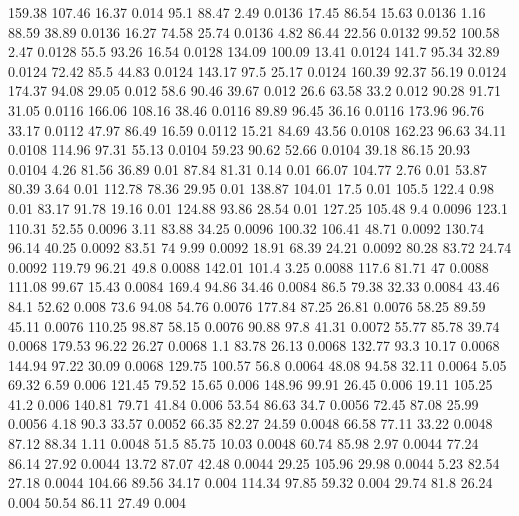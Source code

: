 159.38	107.46	16.37	0.014
95.1	88.47	2.49	0.0136
17.45	86.54	15.63	0.0136
1.16	88.59	38.89	0.0136
16.27	74.58	25.74	0.0136
4.82	86.44	22.56	0.0132
99.52	100.58	2.47	0.0128
55.5	93.26	16.54	0.0128
134.09	100.09	13.41	0.0124
141.7	95.34	32.89	0.0124
72.42	85.5	44.83	0.0124
143.17	97.5	25.17	0.0124
160.39	92.37	56.19	0.0124
174.37	94.08	29.05	0.012
58.6	90.46	39.67	0.012
26.6	63.58	33.2	0.012
90.28	91.71	31.05	0.0116
166.06	108.16	38.46	0.0116
89.89	96.45	36.16	0.0116
173.96	96.76	33.17	0.0112
47.97	86.49	16.59	0.0112
15.21	84.69	43.56	0.0108
162.23	96.63	34.11	0.0108
114.96	97.31	55.13	0.0104
59.23	90.62	52.66	0.0104
39.18	86.15	20.93	0.0104
4.26	81.56	36.89	0.01
87.84	81.31	0.14	0.01
66.07	104.77	2.76	0.01
53.87	80.39	3.64	0.01
112.78	78.36	29.95	0.01
138.87	104.01	17.5	0.01
105.5	122.4	0.98	0.01
83.17	91.78	19.16	0.01
124.88	93.86	28.54	0.01
127.25	105.48	9.4	0.0096
123.1	110.31	52.55	0.0096
3.11	83.88	34.25	0.0096
100.32	106.41	48.71	0.0092
130.74	96.14	40.25	0.0092
83.51	74	9.99	0.0092
18.91	68.39	24.21	0.0092
80.28	83.72	24.74	0.0092
119.79	96.21	49.8	0.0088
142.01	101.4	3.25	0.0088
117.6	81.71	47	0.0088
111.08	99.67	15.43	0.0084
169.4	94.86	34.46	0.0084
86.5	79.38	32.33	0.0084
43.46	84.1	52.62	0.008
73.6	94.08	54.76	0.0076
177.84	87.25	26.81	0.0076
58.25	89.59	45.11	0.0076
110.25	98.87	58.15	0.0076
90.88	97.8	41.31	0.0072
55.77	85.78	39.74	0.0068
179.53	96.22	26.27	0.0068
1.1	83.78	26.13	0.0068
132.77	93.3	10.17	0.0068
144.94	97.22	30.09	0.0068
129.75	100.57	56.8	0.0064
48.08	94.58	32.11	0.0064
5.05	69.32	6.59	0.006
121.45	79.52	15.65	0.006
148.96	99.91	26.45	0.006
19.11	105.25	41.2	0.006
140.81	79.71	41.84	0.006
53.54	86.63	34.7	0.0056
72.45	87.08	25.99	0.0056
4.18	90.3	33.57	0.0052
66.35	82.27	24.59	0.0048
66.58	77.11	33.22	0.0048
87.12	88.34	1.11	0.0048
51.5	85.75	10.03	0.0048
60.74	85.98	2.97	0.0044
77.24	86.14	27.92	0.0044
13.72	87.07	42.48	0.0044
29.25	105.96	29.98	0.0044
5.23	82.54	27.18	0.0044
104.66	89.56	34.17	0.004
114.34	97.85	59.32	0.004
29.74	81.8	26.24	0.004
50.54	86.11	27.49	0.004